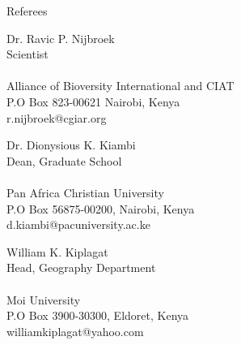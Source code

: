 \documentclass{resume} %
\begin{document}


\begin{rSection}{Referees}
\begin{multicols}{3}
\begin{esSubsection}
{Dr. Ravic P. Nijbroek}\\
{Scientist}\\
{}\\
{Alliance of Bioversity International and CIAT}\\
{P.O Box 823-00621 Nairobi, Kenya}\\
{r.nijbroek@cgiar.org}
\end{esSubsection}

\begin{esSubsection}
{Dr. Dionysious K. Kiambi}\\
{Dean, Graduate School}\\
{}\\
{Pan Africa Christian University}\\
{P.O Box 56875-00200, Nairobi, Kenya}\\
{d.kiambi@pacuniversity.ac.ke}
\end{esSubsection}

\begin{esSubsection}
{William K. Kiplagat}\\
{Head, Geography Department}\\
{}\\
{Moi University}\\
{P.O Box 3900-30300, Eldoret, Kenya}\\
{williamkiplagat@yahoo.com}
\end{esSubsection}
\end{multicols}

\end{rSection}
\end{document}

